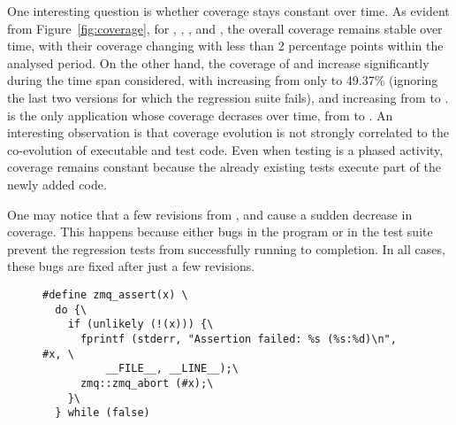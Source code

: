 One interesting question is whether coverage stays constant over time.
As evident from Figure~\ref{fig:coverage}, for \binutils, \git,
\memcached, and \redis, the overall coverage remains stable over time,
with their coverage changing with less than 2 percentage points within
the analysed period. On the other hand, the coverage of
\lighttpdtwo and \zeromq increase significantly during the time span
considered, with \lighttpdtwo increasing from only
\lighttpdtwoInitialCoverage to 49.37\% (ignoring the last two
versions for which the regression suite fails), and \zeromq increasing
from \zeromqInitialCoverage to \zeromqFinalCoverage. \beanstalkd is the only
application whose coverage decrases over time, from \beanstalkdInitialCoverage
to \beanstalkdFinalCoverage. An interesting observation is that coverage
evolution is not strongly correlated to the co-evolution of executable and test
code. Even when testing is a phased activity, coverage remains constant
because the already existing tests execute part of the newly added code.


One may notice that a few revisions from \lighttpdtwo, \memcached and \redis
cause a sudden decrease in coverage. This happens because either bugs in the
program or in the test suite prevent the regression tests from
successfully running to completion. In all cases, these bugs are fixed
after just a few revisions.

\begin{figure}[t]
\begin{lstlisting}[label=lst:zeromqassert,basicstyle=\footnotesize\ttfamily,xleftmargin=0pt,numbers=none,caption={Example of an assertion macro used in \zeromq codebase.}]
#define zmq_assert(x) \
  do {\
    if (unlikely (!(x))) {\
      fprintf (stderr, "Assertion failed: %s (%s:%d)\n", #x, \
          __FILE__, __LINE__);\
      zmq::zmq_abort (#x);\
    }\
  } while (false)
\end{lstlisting}
\end{figure}

